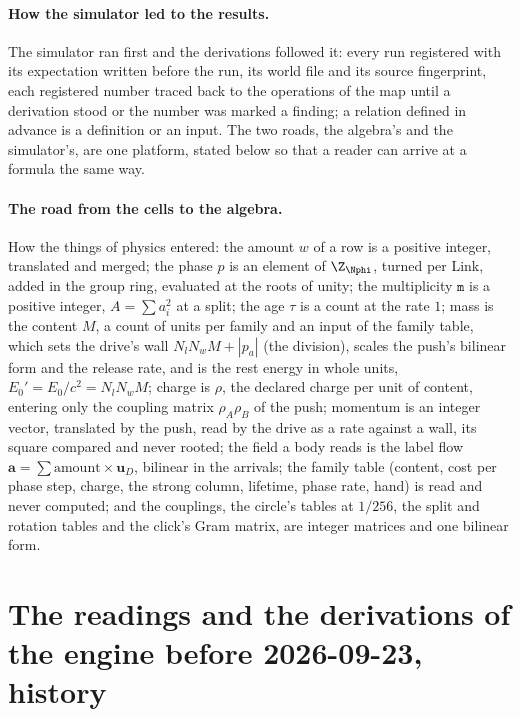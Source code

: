\paragraph{How the simulator led to the results.} The simulator ran first and the derivations followed it: every run registered with its expectation written before the run, its world file and its source fingerprint, each registered number traced back to the operations of the map until a derivation stood or the number was marked a finding; a relation defined in advance is a definition or an input. The two roads, the algebra's and the simulator's, are one platform, stated below so that a reader can arrive at a formula the same way.



\paragraph{The road from the cells to the algebra.} How the things of physics entered: the amount $w$ of a row is a positive integer, translated and merged; the phase $p$ is an element of $\Z_{\Nphi}$, turned per Link, added in the group ring, evaluated at the roots of unity; the multiplicity $\mathtt m$ is a positive integer, $A = \sum a_i^2$ at a split; the age $\tau$ is a count at the rate $1$; mass is the content $M$, a count of units per family and an input of the family table, which sets the drive's wall $N_l N_w M + |p_a|$ (the division), scales the push's bilinear form and the release rate, and is the rest energy in whole units, $E_0' = E_0/c^2 = N_l N_w M$; charge is $\rho$, the declared charge per unit of content, entering only the coupling matrix $\rho_A\rho_B$ of the push; momentum is an integer vector, translated by the push, read by the drive as a rate against a wall, its square compared and never rooted; the field a body reads is the label flow $\mathbf a = \sum \mathrm{amount} \times \mathbf u_D$, bilinear in the arrivals; the family table (content, cost per phase step, charge, the strong column, lifetime, phase rate, hand) is read and never computed; and the couplings, the circle's tables at $1/256$, the split and rotation tables and the click's Gram matrix, are integer matrices and one bilinear form.   


\section{The readings and the derivations of the engine before 2026-09-23, history}\label{rec:oldreadings}


